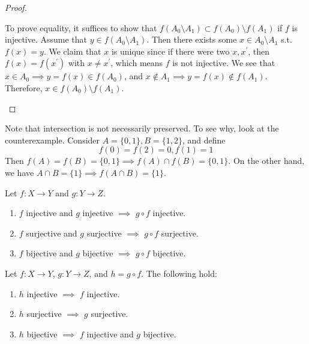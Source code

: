 \begin{proof}
\begin{enumerate}
      To prove equality, it suffices to show that $f(A_0 \setminus A_1) \subset f(A_0) \setminus f(A_1)$ if $f$ is injective. Assume that $y \in f(A_0 \setminus A_1)$. Then there exists some $x \in A_0 \setminus A_1$ s.t. $f(x) = y$. We claim that $x$ is unique since if there were two $x, x^\prime$, then $f(x) = f(x^\prime)$ with $x \neq x^\prime$, which means $f$ is not injective. We see that $x \in A_0 \implies y = f(x) \in f(A_0)$, and $x \not\in A_1 \implies y = f(x) \not\in f(A_1)$. Therefore, $x \in f(A_0) \setminus f(A_1)$. 
    \end{enumerate}
  \end{proof} 

  \begin{example}
    Note that intersection is not necessarily preserved. To see why, look at the counterexample. Consider $A = \{0, 1\}, B = \{1, 2\}$, and define 
    \begin{equation}
      f(0) = f(2) = 0, f(1) = 1
    \end{equation} 
    Then $f(A) = f(B) = \{0, 1\} \implies f(A) \cap f(B) = \{0, 1\}$. On the other hand, we have $A \cap B = \{1\} \implies f(A \cap B) = \{1\}$. 
  \end{example}

  \begin{theorem}[Composition]
    Let $f: X \rightarrow Y$ and $g: Y \rightarrow Z$. 
    \begin{enumerate}
      \item $f$ injective and $g$ injective $\implies$ $g \circ f$ injective. 
      \item $f$ surjective and $g$ surjective $\implies$ $g \circ f$ surjective. 
      \item $f$ bijective and $g$ bijective $\implies$ $g \circ f$ bijective. 
    \end{enumerate}
  \end{theorem}

  \begin{theorem}
    Let $f: X \rightarrow Y$, $g: Y \rightarrow Z$, and $h = g \circ f$. The following hold: 
    \begin{enumerate}
      \item $h$ injective $\implies$ $f$ injective. 
      \item $h$ surjective $\implies$ $g$ surjective. 
      \item $h$ bijective $\implies$ $f$ injective and $g$ bijective. 
    \end{enumerate}
  \end{theorem} 

